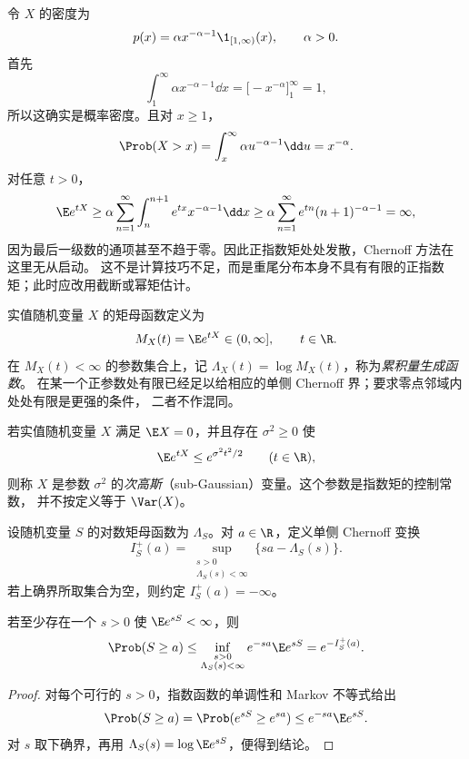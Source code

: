 \begin{example}\label{ex:5-4-1-3}
令 $X$ 的密度为
\[
 p(x)=\alpha x^{-\alpha-1}\1_{[1,\infty)}(x),\qquad \alpha>0.
\]
首先
\[
 \int_1^\infty\alpha x^{-\alpha-1}\dd x
 =\bigl[-x^{-\alpha}\bigr]_{1}^{\infty}=1,
\]
所以这确实是概率密度。且对 $x\ge1$，
\[
 \Prob(X>x)=\int_x^\infty\alpha u^{-\alpha-1}\dd u=x^{-\alpha}.
\]
对任意 $t>0$，
\[
 \E e^{tX}
 \geq\alpha\sum_{n=1}^{\infty}
       \int_n^{n+1}e^{tx}x^{-\alpha-1}\dd x
 \geq\alpha\sum_{n=1}^{\infty}e^{tn}(n+1)^{-\alpha-1}=\infty,
\]
因为最后一级数的通项甚至不趋于零。因此正指数矩处处发散，Chernoff 方法在这里无从启动。
这不是计算技巧不足，而是重尾分布本身不具有有限的正指数矩；此时应改用截断或幂矩估计。
\end{example}

\begin{definition}[矩母函数与累积量生成函数]\label{def:5-4-1-1}
实值随机变量 $X$ 的矩母函数定义为
\[
 M_X(t)=\E e^{tX}\in(0,\infty],\qquad t\in\R.
\]
在 $M_X(t)<\infty$ 的参数集合上，记
$\Lambda_X(t)=\log M_X(t)$，称为\emph{累积量生成函数}。
在某一个正参数处有限已经足以给相应的单侧 Chernoff 界；要求零点邻域内处处有限是更强的条件，
二者不作混同。
\end{definition}

\begin{definition}[次高斯变量]\label{def:5-4-1-2}
若实值随机变量 $X$ 满足 $\E X=0$，并且存在 $\sigma^2\geq0$ 使
\[
 \E e^{tX}\leq e^{\sigma^2t^2/2}\qquad(t\in\R),
\]
则称 $X$ 是参数 $\sigma^2$ 的\emph{次高斯}（sub-Gaussian）变量。这个参数是指数矩的控制常数，
并不按定义等于 $\Var(X)$。
\end{definition}

\begin{definition}[Chernoff 变换]\label{def:5-4-1-3}
设随机变量 $S$ 的对数矩母函数为 $\Lambda_S$。对 $a\in\R$，定义单侧 Chernoff 变换
\[
 I_S^+(a)=\sup_{\substack{s>0\\\Lambda_S(s)<\infty}}
 \{sa-\Lambda_S(s)\}.
\]
若上确界所取集合为空，则约定 $I_S^+(a)=-\infty$。
\end{definition}

\begin{proposition}[Chernoff 上界]
若至少存在一个 $s>0$ 使 $\E e^{sS}<\infty$，则
\[
 \Prob(S\geq a)
 \leq\inf_{\substack{s>0\\\Lambda_S(s)<\infty}}
 e^{-sa}\E e^{sS}
 =e^{-I_S^+(a)}.
\]
\end{proposition}

\begin{proof}
对每个可行的 $s>0$，指数函数的单调性和 Markov 不等式给出
\[
 \Prob(S\geq a)
 =\Prob(e^{sS}\geq e^{sa})
 \leq e^{-sa}\E e^{sS}.
\]
对 $s$ 取下确界，再用 $\Lambda_S(s)=\log\E e^{sS}$，便得到结论。
\end{proof}

